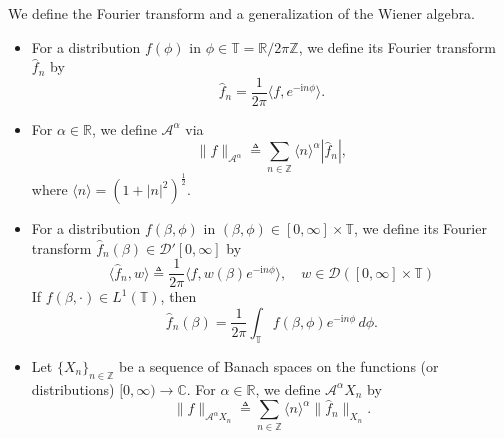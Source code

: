 \documentclass[11pt]{article}
\theoremstyle{definition}
\theoremstyle{remark}
\numberwithin{equation}{section}
\newcommand{\mbb}{\mathbb}
\newcommand{\mcal}{\mathcal}
\renewcommand{\hat}{\widehat}
\newcommand{\Z}{\mbb{Z}}
\newcommand{\R}{\mbb{R}}
\newcommand{\C}{\mbb{C}}
\newcommand{\norm}[1]{\lVert #1 \rVert}
\begin{document}
We define the Fourier transform and a generalization of the Wiener algebra.
\begin{itemize}
    \item For a distribution $f(\phi)$ in $\phi\in \mbb{T} = \R/2\pi\Z$, we define its Fourier transform $\hat{f}_n$ by
    \[\hat{f}_n = \frac{1}{2\pi} \langle f, e^{-\textrm{i}n\phi} \rangle.\]
    \item For $\alpha\in\R$, we define $\mcal{A}^\alpha$ via
    \[\norm{f}_{\mcal{A}^\alpha} \triangleq \sum_{n\in\Z} \langle n \rangle^\alpha |\hat{f}_n|,\]
    where $\langle n\rangle = (1 + |n|^2)^{\frac{1}{2}}$.
  \item For a distribution $f(\beta,\phi)$ in $(\beta,\phi) \in [0,\infty] \times \mbb{T}$, we define its Fourier transform $\hat{f}_n(\beta) \in \mcal{D}'[0,\infty]$ by
  \[ \langle \hat{f}_n, w \rangle \triangleq \frac{1}{2\pi} \langle f, w(\beta) e^{-\textrm{i}n\phi} \rangle, \quad w\in \mcal{D}([0,\infty] \times \mbb{T})\]
  If $f(\beta, \cdot)\in L^1(\mbb{T})$, then
  \[\hat{f}_n(\beta) = \frac{1}{2\pi} \int_{\mbb{T}} f(\beta,\phi) e^{-\textrm{i}n \phi} \,d\phi.\]
  \item Let $\{X_n\}_{n\in \Z}$ be a sequence of Banach spaces on the functions (or distributions) $[0,\infty) \to \C$. For $\alpha\in\R$, we define $\mcal{A}^\alpha X_n$ by
  \[\norm{f}_{\mcal{A}^\alpha X_n} \triangleq \sum_{n\in\Z} \langle n \rangle^{\alpha} \norm{\hat{f}_n}_{X_n}.\]
\end{itemize}
\end{document}
